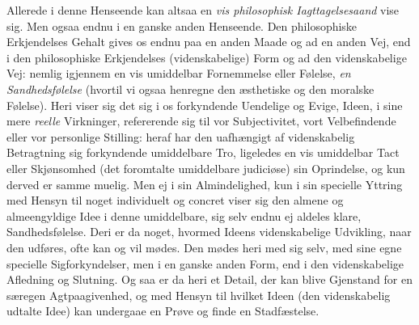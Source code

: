 \documentclass[12pt,a4paper]{book}
\newcommand{\apage}[1]{\marginnote{\footnotesize\textit{[#1]}}}
\begin{document}
Allerede i denne Henseende kan altsaa en \emph{vis philosophisk Iagttagelsesaand}
vise sig. Men ogsaa endnu i en ganske anden Henseende. Den philosophiske
Erkjendelses Gehalt gives os endnu paa en anden Maade og ad en anden Vej, end i
den philosophiske Erkjendelses (videnskabelige) Form og ad den videnskabelige Vej:
nemlig igjennem en vis umiddelbar Fornemmelse eller Følelse, \emph{en
Sandhedsfølelse} (hvortil vi ogsaa henregne den æsthetiske og den moralske
Følelse). Heri viser sig det sig i os forkyndende Uendelige og Evige, Ideen, i
sine mere \emph{reelle} Virkninger, refererende sig til vor Subjectivitet, vort
Velbefindende eller vor personlige Stilling: heraf har den uafhængigt af
videnskabelig Betragtning sig forkyndende umiddelbare Tro, ligeledes en vis
umiddelbar Tact eller Skjønsomhed (det foromtalte umiddelbare judiciøse) sin
Oprindelse, og kun derved er samme muelig. Men ej i sin Almindelighed, kun i sin
specielle Yttring med Hensyn til noget individuelt og concret viser sig den almene
og almeengyldige Idee i denne  \apage{151} umiddelbare, sig selv endnu ej aldeles klare,
Sandhedsfølelse. Deri er da noget, hvormed Ideens videnskabelige Udvikling, naar
den udføres, ofte kan og vil mødes. Den mødes heri med sig selv, med sine egne
specielle Sigforkyndelser, men i en ganske anden Form, end i den videnskabelige
Afledning og Slutning. Og saa er da heri et Detail, der kan blive Gjenstand
for en særegen Agtpaagivenhed, og med Hensyn til hvilket Ideen (den videnskabelig
udtalte Idee) kan undergaae en Prøve og finde en Stadfæstelse.
\end{document}

